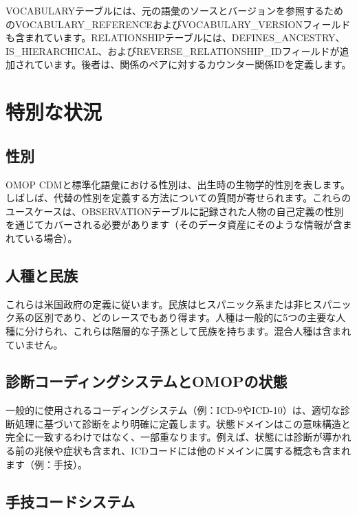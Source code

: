 \documentclass[
  11pt]{book}
\theoremstyle{definition}
\theoremstyle{definition}
\theoremstyle{definition}
\theoremstyle{definition}
\theoremstyle{remark}
\begin{document}
VOCABULARYテーブルには、元の語彙のソースとバージョンを参照するためのVOCABULARY\_REFERENCEおよびVOCABULARY\_VERSIONフィールドも含まれています。RELATIONSHIPテーブルには、DEFINES\_ANCESTRY、IS\_HIERARCHICAL、およびREVERSE\_RELATIONSHIP\_IDフィールドが追加されています。後者は、関係のペアに対するカウンター関係IDを定義します。

\section{特別な状況}\label{specialSituations}

\subsection{性別}\label{ux6027ux5225}

OMOP CDMと標準化語彙における性別は、出生時の生物学的性別を表します。しばしば、代替の性別を定義する方法についての質問が寄せられます。これらのユースケースは、OBSERVATIONテーブルに記録された人物の自己定義の性別を通じてカバーされる必要があります（そのデータ資産にそのような情報が含まれている場合）。

\subsection{人種と民族}\label{ux4ebaux7a2eux3068ux6c11ux65cf}

これらは米国政府の定義に従います。民族はヒスパニック系または非ヒスパニック系の区別であり、どのレースでもあり得ます。人種は一般的に5つの主要な人種に分けられ、これらは階層的な子孫として民族を持ちます。混合人種は含まれていません。

\subsection{診断コーディングシステムとOMOPの状態}\label{ux8a3aux65adux30b3ux30fcux30c7ux30a3ux30f3ux30b0ux30b7ux30b9ux30c6ux30e0ux3068omopux306eux72b6ux614b}

一般的に使用されるコーディングシステム（例：ICD-9やICD-10）は、適切な診断処理に基づいて診断をより明確に定義します。状態ドメインはこの意味構造と完全に一致するわけではなく、一部重なります。例えば、状態には診断が導かれる前の兆候や症状も含まれ、ICDコードには他のドメインに属する概念も含まれます（例：手技）。

\subsection{手技コードシステム}\label{ux624bux6280ux30b3ux30fcux30c9ux30b7ux30b9ux30c6ux30e0}
\end{document}
